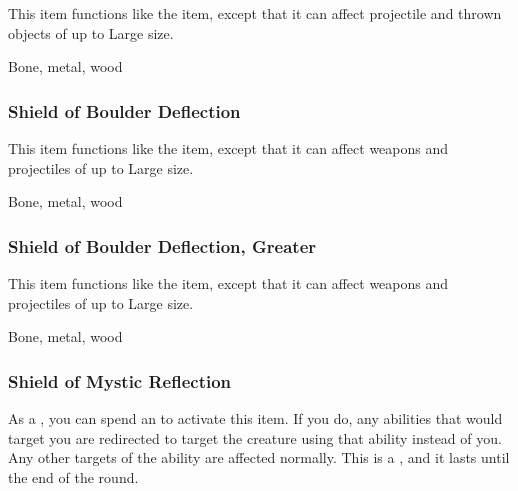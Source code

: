 This item functions like the  item, except that it can affect projectile and thrown objects of up to Large size.



 


 Bone, metal, wood


\lowercase{\hypertarget{item:Shield of Boulder Deflection}{}}\label{item:Shield of Boulder Deflection}
\hypertarget{item:Shield of Boulder Deflection}{\subsubsection{Shield of Boulder Deflection\hfill{}}}

This item functions like the  item, except that it can affect weapons and projectiles of up to Large size.



 


 Bone, metal, wood


\lowercase{\hypertarget{item:Shield of Boulder Deflection, Greater}{}}\label{item:Shield of Boulder Deflection, Greater}
\hypertarget{item:Shield of Boulder Deflection, Greater}{\subsubsection{Shield of Boulder Deflection, Greater\hfill{}}}

This item functions like the  item, except that it can affect weapons and projectiles of up to Large size.



 


 Bone, metal, wood


\lowercase{\hypertarget{item:Shield of Mystic Reflection}{}}\label{item:Shield of Mystic Reflection}
\hypertarget{item:Shield of Mystic Reflection}{\subsubsection{Shield of Mystic Reflection\hfill{}}}

As a , you can spend an  to activate this item.
If you do, any   abilities that would target you are redirected to target the creature using that ability instead of you.
Any other targets of the ability are affected normally.
This is a , and it lasts until the end of the round.




